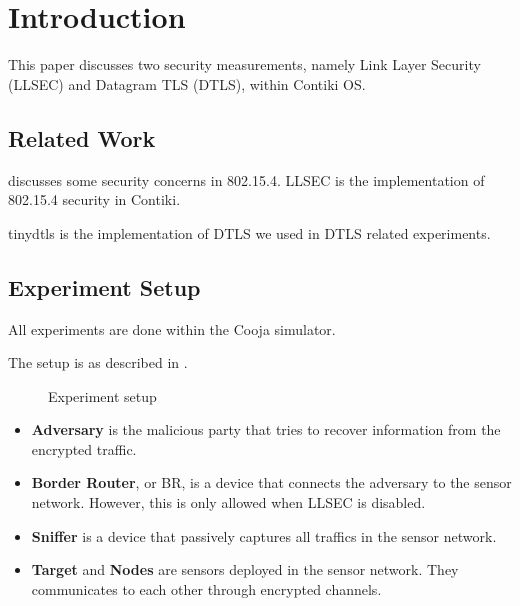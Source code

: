 \chapter{Introduction}
This paper discusses two security measurements, namely Link Layer Security (LLSEC) and Datagram TLS (DTLS), within Contiki OS.

\section{Related Work}
\cite{802154Sec} discusses some security concerns in 802.15.4.  LLSEC\cite{LLSEC} is the implementation of 802.15.4 security in Contiki.

tinydtls\cite{tinydtls} is the implementation of DTLS we used in DTLS related experiments.

\section{Experiment Setup}
All experiments are done within the Cooja simulator.

The setup is as described in .

\begin{figure}
\caption{Experiment setup} \label{fig: Setup}
\end{figure}

\begin{itemize}
\item{\bf Adversary} is the malicious party that tries to recover information from the encrypted traffic.
\item{\bf Border Router}, or BR, is a device that connects the adversary to the sensor network. However, this is only allowed when LLSEC is disabled. 
\item{\bf Sniffer} is a device that passively captures all traffics in the sensor network. 
\item{\bf Target} and {\bf Nodes} are sensors deployed in the sensor network. They communicates to each other through encrypted channels.
\end{itemize}